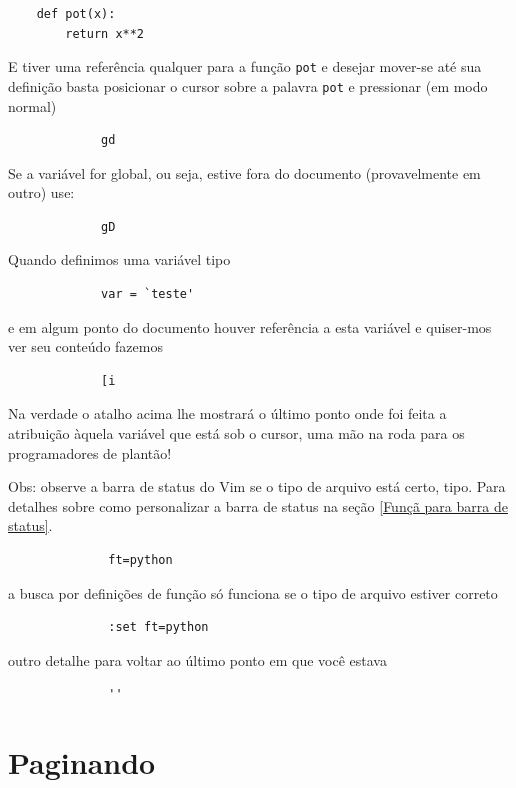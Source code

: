 \documentclass[10pt,a4paper,openany]{book}
\begin{document}
\begin{verbatim}
	def pot(x):
		return x**2
\end{verbatim}

E tiver uma referência qualquer para a função \verb+pot+ e desejar
mover-se até sua definição basta posicionar o cursor sobre a palavra
\verb+pot+ e pressionar (em modo normal)

\begin{verbatim}
			 gd
\end{verbatim}

Se a variável for global, ou seja, estive fora do documento
(provavelmente em outro) use:

\begin{verbatim}
			 gD
\end{verbatim}

Quando definimos uma variável tipo

\begin{verbatim}
			 var = `teste'
\end{verbatim}

e em algum ponto do documento houver referência a esta variável e
quiser-mos ver seu conteúdo fazemos

\begin{verbatim}
			 [i
\end{verbatim}
Na verdade o atalho acima lhe mostrará o último ponto onde foi feita
a atribuição àquela variável que está sob o cursor, uma mão na roda
para os programadores de plantão!

Obs: observe a  barra de status do Vim se o tipo de arquivo está certo,
tipo. Para detalhes sobre como personalizar a barra de status na seção
\ref{Funçã para barra de status}.

\begin{verbatim}
			  ft=python
\end{verbatim}

a busca por definições de função só funciona se o tipo de arquivo
estiver correto

\begin{verbatim}
			  :set ft=python
\end{verbatim}

outro detalhe para voltar ao último ponto em que você estava

\begin{verbatim}
			  ''
\end{verbatim}

\section{Paginando}
\label{Paginando}
\end{document}
